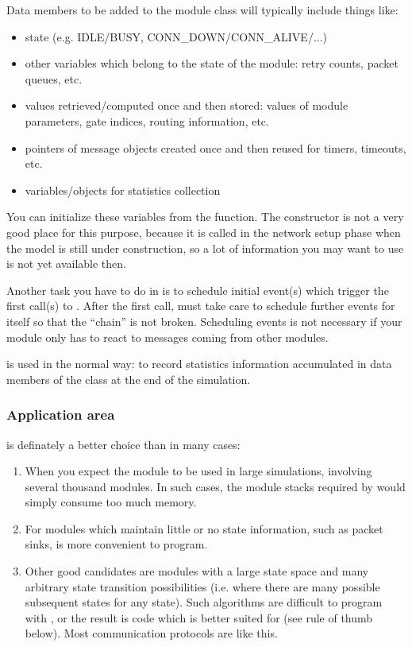 Data members to be added to the module class will typically include
things like:

\begin{itemize}
  \item{state (e.g. IDLE/BUSY, CONN\_DOWN/CONN\_ALIVE/...)}
  \item{other variables which belong to the state of the module: retry
    counts, packet queues, etc.}
  \item{values retrieved/computed once and then stored: values of module
    parameters, gate indices, routing information, etc.}
  \item{pointers of message objects created once and then reused for
    timers, timeouts, etc.}
  \item{variables/objects for statistics collection}
\end{itemize}

You can initialize these variables from the 
function.  The constructor is not a very good place
for this purpose, because it is called in the network setup phase when
the model is still under construction, so a lot of information you may
want to use is not yet available then.

Another task you have to do in  is to schedule
initial event(s) which trigger the first call(s)
to .  After the first call,
 must take care to schedule further events for
itself so that the ``chain'' is not broken. Scheduling events is not
necessary if your module only has to react to messages coming from
other modules.

 is used in the normal way: to record statistics information
accumulated in data members of the class at the end of the simulation.


\subsubsection{Application area}


 is definately a better choice than 
in many cases:

\begin{enumerate}
  \item{When you expect the module to be used in large simulations,
      involving several thousand modules. In such cases, the module stacks
      required by  would simply consume too much memory.}
  \item{For modules which maintain little or no state information,
      such as packet sinks,  is more convenient to program.}
  \item{Other good candidates are modules with a large state space and
      many arbitrary state transition possibilities (i.e. where there
      are many possible subsequent states for any state). Such algorithms
      are difficult to program with , or the result is code
      which is better suited for  (see rule of thumb
      below). Most communication protocols are like this.}
\end{enumerate}

